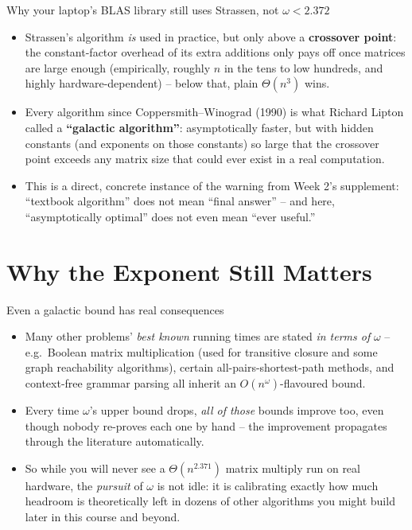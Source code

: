 \documentclass[11pt,aspectratio=169]{beamer}
\begin{document}
\begin{frame}{Why your laptop's BLAS library still uses Strassen, not $\omega < 2.372$}
  \begin{itemize}
    \item Strassen's algorithm \emph{is} used in practice, but only above a
    \textbf{crossover point}: the constant-factor overhead of its extra additions only pays
    off once matrices are large enough (empirically, roughly $n$ in the tens to low
    hundreds, and highly hardware-dependent) -- below that, plain $\Theta(n^3)$ wins.
    \item Every algorithm since Coppersmith--Winograd (1990) is what Richard Lipton called a
    \textbf{``galactic algorithm''}: asymptotically faster, but with hidden constants (and
    exponents on those constants) so large that the crossover point exceeds any matrix size
    that could ever exist in a real computation.
    \item This is a direct, concrete instance of the warning from Week 2's supplement:
    ``textbook algorithm'' does not mean ``final answer'' -- and here, ``asymptotically
    optimal'' does not even mean ``ever useful.''
  \end{itemize}
\end{frame}

\section{Why the Exponent Still Matters}

\begin{frame}{Even a galactic bound has real consequences}
  \begin{itemize}
    \item Many other problems' \emph{best known} running times are stated \emph{in terms
    of} $\omega$ -- e.g.\ Boolean matrix multiplication (used for transitive closure and
    some graph reachability algorithms), certain all-pairs-shortest-path methods, and
    context-free grammar parsing all inherit an $O(n^{\omega})$-flavoured bound.
    \item Every time $\omega$'s upper bound drops, \emph{all of those} bounds improve too,
    even though nobody re-proves each one by hand -- the improvement propagates through the
    literature automatically.
    \item So while you will never see a $\Theta(n^{2.371})$ matrix multiply run on real
    hardware, the \emph{pursuit} of $\omega$ is not idle: it is calibrating exactly how much
    headroom is theoretically left in dozens of other algorithms you might build later in
    this course and beyond.
  \end{itemize}
\end{frame}
\end{document}

